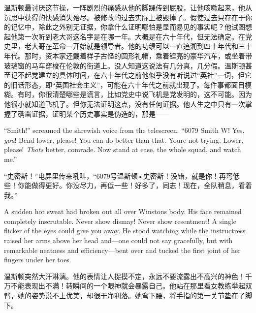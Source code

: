 \begin{paracol}{2}
\switchcolumn

温斯顿最讨厌这节操，一阵剧烈的痛感从他的脚踝传到屁股，让他咳嗽起来，他从沉思中获得的快感消失殆尽。被修改的过去实际上被毁掉了。假使过去只存在于你的记忆中，除此之外别无证据，你拿什么证明哪怕是显而易见的事实呢？他试图想起他第一次听到老大哥这名字是在哪一年。大概是在六十年代，但无法确定。在党史里，老大哥在革命一开始就是领导者。他的功绩可以一直追溯到四十年代和三十年代。那时，资本家还戴着样子古怪的圆形礼帽，乘着锃亮的豪华汽车，或坐着带玻璃窗的马车穿梭在伦敦的街道上。没人知道这说法有几分真，几分假。温斯顿甚至记不起党建立的具体时间，在六十年代之前他似乎没有听说过``英社''一词，但它的旧话形态，即``英国社会主义''，可能在六十年代之前就出现了。每件事都面目模糊。有时，你很清楚哪些是谎言，比如党史中说飞机是党发明的，这不可能。因为他很小就知道飞机了。但你无法证明这点，没有任何证据。他人生之中只有一次掌握了确凿证据，证明某个历史事实是伪造的，那是——

\switchcolumn*

``Smith!'' screamed the shrewish voice from the telescreen. ``6079 Smith W!
Yes, \emph{you}! Bend lower, please! You can do better than that.
You\textquotesingle re not trying. Lower, please!
\emph{That\textquotesingle s} better, comrade. Now stand at ease, the
whole squad, and watch me.''

\switchcolumn

``史密斯！''电屏里传来吼叫，``6079号温斯顿•史密斯！没错，就是你！再弯低些！你能做得更好。你没尽力，再低一些！好多了，同志！现在，全队稍息，看着我。''

\switchcolumn*

A sudden hot sweat had broken out all over Winston\textquotesingle s
body. His face remained completely inscrutable. Never show dismay! Never
show resentment! A single flicker of the eyes could give you away. He
stood watching while the instructress raised her arms above her head
and---one could not say gracefully, but with remarkable neatness and
efficiency---bent over and tucked the first joint of her fingers under
her toes.

\switchcolumn

温斯顿突然大汗淋漓。他的表情让人捉摸不定，永远不要流露出不高兴的神色！千万不能表现出不满！转瞬间的一个眼神就会暴露自己。他站在那里看女教练举起双臂，她的姿势说不上优美，却很干净利落。她弯下腰，将手指的第一关节垫在了脚下。

\switchcolumn*


\end{paracol}
